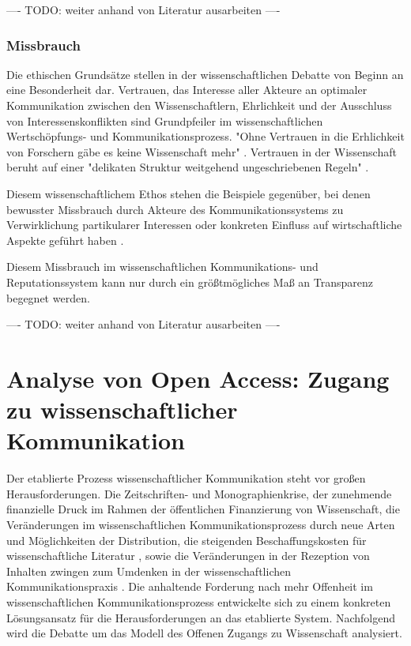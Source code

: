 ---- TODO: weiter anhand von Literatur ausarbeiten ----

\subsubsection{Missbrauch}

Die ethischen Grundsätze stellen in der wissenschaftlichen Debatte von Beginn an eine Besonderheit dar. Vertrauen, das Interesse aller Akteure an optimaler Kommunikation zwischen den Wissenschaftlern, Ehrlichkeit und der Ausschluss von Interessenskonflikten sind Grundpfeiler im wissenschaftlichen Wertschöpfungs- und Kommunikationsprozess. "Ohne Vertrauen in die Erhlichkeit von Forschern gäbe es keine Wissenschaft mehr" \cite{hagner_2015_sache_buches}. Vertrauen in der Wissenschaft beruht auf einer "delikaten Struktur weitgehend ungeschriebenen Regeln" \cite{grand_2012_open}.

Diesem wissenschaftlichem Ethos stehen die Beispiele gegenüber, bei denen bewusster Missbrauch durch Akteure des Kommunikationssystems zu Verwirklichung partikularer Interessen oder konkreten Einfluss auf wirtschaftliche Aspekte geführt haben \cite{Beall_2012}.

Diesem Missbrauch im wissenschaftlichen Kommunikations- und Reputationssystem kann nur durch ein größtmögliches Maß an Transparenz begegnet werden.

---- TODO: weiter anhand von Literatur ausarbeiten ----

\section{Analyse von Open Access: Zugang zu wissenschaftlicher Kommunikation}

Der etablierte Prozess wissenschaftlicher Kommunikation steht vor großen Herausforderungen. Die Zeitschriften- und Monographienkrise, der zunehmende finanzielle Druck im Rahmen der öffentlichen Finanzierung von Wissenschaft, die Veränderungen im wissenschaftlichen Kommunikationsprozess durch neue Arten und Möglichkeiten der Distribution, die steigenden Beschaffungskosten für wissenschaftliche Literatur \cite{cite:17} \cite{muller_2010_open}, sowie die Veränderungen in der Rezeption von Inhalten \cite{holub_2013_reception} zwingen zum Umdenken in der wissenschaftlichen Kommunikationspraxis \cite{suchen}. Die anhaltende Forderung nach mehr Offenheit im wissenschaftlichen Kommunikationsprozess entwickelte sich zu einem konkreten Lösungsansatz für die Herausforderungen an das etablierte System. Nachfolgend wird die Debatte um das Modell des Offenen Zugangs zu Wissenschaft analysiert.

